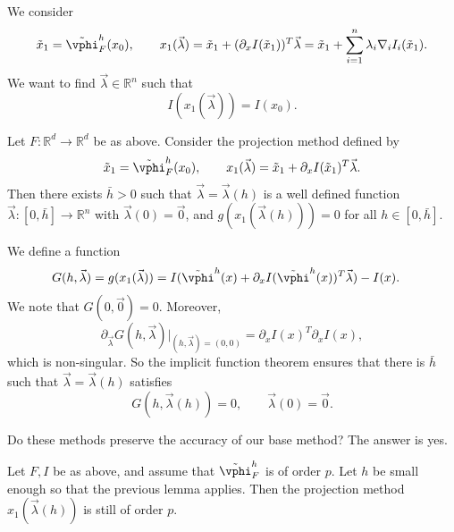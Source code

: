 \documentclass[12pt]{article}
\begin{document}
We consider 
\[
\tilde x_1 = \tilde \vphi_F^{h}(x_0), \qquad x_1(\vec \lambda) = \tilde x_1 + (\partial_x I(\tilde x_1))^{T} \vec \lambda = \tilde x_1 + \sum_{i = 1}^{n} \lambda_i \nabla_i I_i(\tilde x_1).
\]
We want to find $\vec \lambda \in \mathbb{R}^{n}$ such that
\[
I(x_1(\vec \lambda)) = I(x_0).
\]


\begin{lemma}
	Let $F : \mathbb{R}^{d} \to \mathbb{R}^{d}$ be as above. Consider the projection method defined by
	\[
	\tilde x_1 = \tilde \vphi_F^{h}(x_0), \qquad x_1(\vec \lambda) = \tilde x_1 + \partial_x I(\tilde x_1)^{T} \vec \lambda.
	\]
	Then there exists $\bar h > 0$ such that $\vec \lambda = \vec \lambda(h)$ is a well defined function $\vec \lambda : [0, \bar h] \to \mathbb{R}^{n}$ with $\vec \lambda(0) = \vec 0$, and $g(x_1(\vec \lambda(h))) = 0$ for all $h \in [0, \bar h]$.
\end{lemma}

\begin{proofbox}
	We define a function
	\begin{align*}
		G(h, \vec \lambda) &= g(x_1(\vec \lambda)) = I(\tilde \vphi^{h}(x) + \partial_x I(\tilde \vphi^{h}(x))^{T} \vec \lambda) - I(x).
	\end{align*}
	We note that $G(0, \vec 0) = 0$. Moreover,
	\[
	\partial_{\vec \lambda} G(h, \vec \lambda)\biggr|_{(h, \vec \lambda) = (0, 0)} = \partial_{x} I(x)^{T} \partial_{x} I(x),
	\]
	which is non-singular. So the implicit function theorem ensures that there is $\bar h$ such that $\vec \lambda = \vec \lambda(h)$ satisfies
	\[
	G(h, \vec \lambda(h)) = 0, \qquad \vec \lambda(0) = \vec 0.
	\]
\end{proofbox}

Do these methods preserve the accuracy of our base method? The answer is yes.

\begin{lemma}
	Let $F, I$ be as above, and assume that $\tilde \vphi_F^{h}$ is of order $p$. Let $h$ be small enough so that the previous lemma applies. Then the projection method $x_1(\vec \lambda(h))$ is still of order $p$.
\end{lemma}
\end{document}
